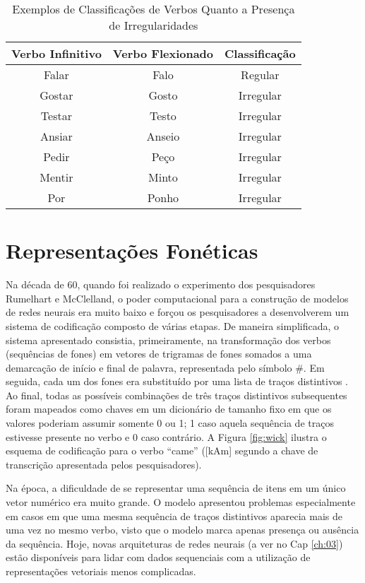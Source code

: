 \begin{center}
\begin{table}[H]
\centering
\begin{tabular}{ccc}
\multicolumn{1}{l}{\textbf{Verbo Infinitivo}} & \multicolumn{1}{l}{\textbf{Verbo Flexionado}} & \multicolumn{1}{l}{\textbf{Classificação}} \\ \hline
Falar & Falo & Regular \\
Gostar & Gosto & Irregular \\
Testar & Testo & Irregular \\
Ansiar & Anseio & Irregular \\
Pedir & Peço & Irregular \\
Mentir & Minto & Irregular \\
Por & Ponho & Irregular
\end{tabular}
\caption{Exemplos de Classificações de Verbos Quanto a Presença de Irregularidades}
\label{tab:irreg}
\end{table}
\end{center}

\section{Representações Fonéticas}
\label{sec:transcr}
Na década de 60, quando foi realizado o experimento dos pesquisadores Rumelhart e McClelland, o poder computacional para a construção de modelos de redes neurais era muito baixo e forçou os pesquisadores a desenvolverem um sistema de codificação composto de várias etapas. De maneira simplificada, o sistema apresentado consistia, primeiramente, na transformação dos verbos (sequências de fones) em vetores de trigramas de fones somados a uma demarcação de início e final de palavra, representada pelo símbolo \#. Em seguida, cada um dos fones era substituído por uma lista de traços distintivos %
. Ao final, todas as possíveis combinações de três traços distintivos subsequentes foram mapeados como chaves em um dicionário de tamanho fixo em que os valores poderiam assumir somente 0 ou 1; 1 caso aquela sequência de traços estivesse presente no verbo e 0 caso contrário. A Figura \ref{fig:wick} ilustra o esquema de codificação para o verbo “came” ([kAm] segundo a chave de transcrição apresentada pelos pesquisadores). 



Na época, a dificuldade de se representar uma sequência de itens em um único vetor numérico era muito grande. O modelo apresentou problemas especialmente em casos em que uma mesma sequência de traços distintivos aparecia mais de uma vez no mesmo verbo, visto que o modelo marca apenas presença ou ausência da sequência. Hoje, novas arquiteturas de redes neurais (a ver no Cap \ref{ch:03}) estão disponíveis para lidar com dados sequenciais com a utilização de representações vetoriais menos complicadas. 

